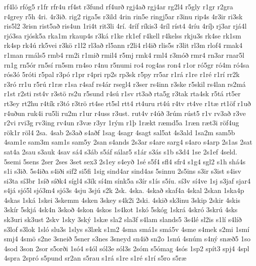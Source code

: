 {rf4l^^f6
rf^^f3g5
r1fr
rfr4u
rf4st
r3fund
rf4ur^^f0
rgj4a^^f0
rgj4ar
rg2l4
r5gly
r1gr
r2gra
r4grey
r5h
4ri.
4r3i^^f0.
rig2
riga5s
r3ild
4rin
rin5e
ringj5ar
r3inu
rip4s
4r3ir
ri3sk
ris5l2
3risn
rist5a^^f0
ris4un
1ri4t
rit3li
4r^^ed.
4r^^edf
r^^edkis3
4r^^edl
r^^edst4
4r^^edu
4r^^ed^^fe
rj3ar
rj^^e14l
rj^^f33sa
rj^^f3sk5a
rka1m
rkaup4s
r3k^^e1
r1ke
rk1ef
r4kell
r4kelss
rkju3s
rk4se
rk1sm
rk4sp
rk4^^fa
rk5vei
r3k^^f6
r1l2
rl3a^^f0
rl5ann
r2li4
rl4i^^f0
rlis5s
r3lit
rl3m
rlof4
rmak4
r1man
rm^^e1ls5
rmb4
rm2i
r1mi^^f0
rmil4
r5mj
rmk4
rml4
r3m^^f3^^f0
rmr4
rn3ar
rnar5l
rn1g
rn5^^f3r
rn5s^^ed
rn5sm
rn4so
r4nu
r5numi
ro4
rog4as
ron4
r1or
r^^f35gr
r^^f34m
r^^f34sa
r^^f3s3^^f3
5r^^f3ti
r5pal
r3p^^f3
r1pr
r4pri
rp2s
rp3sk
r5py
rr5ar
r1r^^e1
r1re
r1r^^e9
r1r^^ed
rr2k
r3r^^f3
rr1u
r5r^^fa
r1r^^e6
r1sa
r4saf
rs4^^e1r
rsegl4
r3ser
rs4inn
r3ske
r5skil
rs4lan
rs2m^^e1
r1st
r2sti
rst4v
r3st^^f6
rs2u
r5sund
r4s^^fa
r1sv
rt3a^^f0
rta5g
r3tak
rta4sk
r5t^^e1
rt5er
rt3ey
rt2hu
r4t^^edk
r3t^^f3
r3tr^^f6
rt4se
rt5sl
rtt4
rt4uru
rt4^^fa
r4tv
rt4ve
r1t^^e6
rt1^^f6f
r1u^^f0
r4u^^f0un
ruk4i
ru5li
ru2m
r1ur
r4uss
r3ust.
rut4v
r4^^fa^^f0
3r^^fam
r^^fast5
r1v
rv3a^^f0
r3ve
r2vi
rvi3g
rv3ing
rv4un
r3v^^e6
r3yr
1r^^fdm
r1^^fe
1r^^e6kt
r^^e6md5a
1r^^e6n
r^^e6t3i
r^^f6f4ug
r^^f6k1r
r^^f6l4
2sa.
4sab
2s3a^^f0
s4a^^f0f
1sag
4sagr
4sagt
sal5at
4s3ald
1sa2m
sam5b
4sam1e
sam3m
sam1s
sam5y
2san
s4ands
2s3ar
s4are
sarg4
s4aro
s4arp
2s1as
2sat
sat4a
2sau
s3auk
4sav
s^^e14
s3^^e1b
s5^^e1f
s^^e1lar5
s1^^e1r
s3^^e1s
s1b
s3d4
1se
2s1ef
4seld.
5semi
5sens
2ser
2ses
3set
sex3
2s1ey
s4ey^^f0
1s^^e9
s5f4
sfl4
sfr4
s1g4
sgl2
s1h
sh^^e14s
s1i
s3i^^f0.
5s4i^^f0a
s4i^^f0i
sif2
si5fi
1sig
sind4ar
sind4as
5sinnu
2s5ins
s3ir
s3ist
s4isv
si3ta
s^^ed3br
1s^^ed^^f0
s^^ed^^f0k4
s^^edgl4
s3^^edk
s^^ed4m
s^^ednk5a
s3^^edr
s1^^eds
s5^^edu.
s^^ed3v
s^^ed4ve
1sj
s3jaf
sjar4
s4j^^e1
sj^^f35l
sj^^f33m4
sj^^f33s
4sju
3sj^^fa
s2k
2sk.
4ska.
4ska^^f0
skaf4a
4skal
2skan
1ska4p
4skas
1sk^^e1
1skei
3skemm
4sken
3skey
s4k2i
2ski.
4ski^^f0
sk3inu
3skip
2skir
4skis
3sk^^edr
5skj^^e1
4sk4n
3sko^^f0
4skon
4skos
1s4kot
1sk^^f3
5sk^^f3g
1skr^^e1
4skr^^f3
3skr^^fa
4sks
sk3uri
sk3ust
2skv
1sky
3sk^^fd
1sk^^e6
sla2
sla3f
s4lam
slands5
3s4l^^e9
sl2is
s1l^^ed
s4l^^ed^^f0
s3lof
s3lok
1sl^^f3
slu3s
1slys
s3l^^e6k
s1m2
4sma
sm^^e11s
sm^^e15v
4sme
s4mek
s2mi
1sm^^ed
smj4
4sm^^f6
s2ne
3snei^^f0
5sner
s3nes
3sneyd
sn4i^^f0
sn2o
1sn^^fa
4sn^^fam
s4n^^fd
sn^^e6^^f05
1so
4sod
3son
2sor
s5or^^f0i
1s^^f34
s4^^f3l
s^^f3l3e
s^^f3l3s
2s^^f3m
s5^^f3mag
4s^^f3s
1sp2
sp^^edt3
spj4
4spl
4spra
2spr^^f3
s5pund
sr2an
s5rau
s1r^^e1
s1re
s1r^^e9
s1r^^ed
s5ro
s5r^^e6
}
